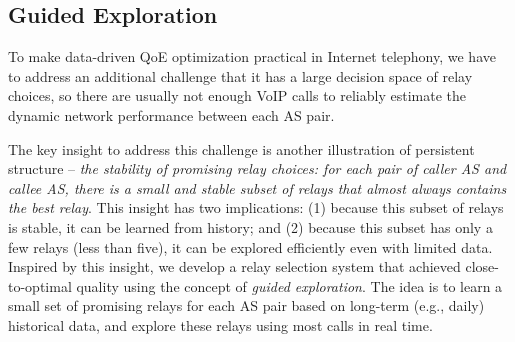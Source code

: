 

\subsection{Guided Exploration}
\label{subsec:overview:guided}

To make data-driven QoE optimization practical in Internet telephony,
we have to address an additional challenge that it has a 
large decision space of relay choices, so there 
are usually not enough VoIP calls to reliably estimate 
the dynamic network performance between each 
AS pair.

The key insight to address this challenge is  another
illustration of persistent structure --
{\em the stability of promising relay choices: for each pair of 
caller AS and callee AS, there is a small and 
stable subset of relays that almost always 
contains the best relay}. 
This insight has two implications: 
(1) because this subset of relays is stable, 
it can be learned from history; and 
(2) because this subset has only a few relays 
(less than five), it can be explored efficiently 
even with limited data.
Inspired by this insight, we develop a relay selection 
system that achieved close-to-optimal quality 
using the concept of {\em guided exploration}. 
The idea is to learn a small set of promising relays 
for each AS pair based on long-term (e.g., daily) 
historical data, and explore these relays using most
calls in real time.

